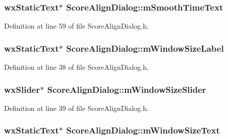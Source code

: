 \subsubsection[{\texorpdfstring{m\+Smooth\+Time\+Text}{mSmoothTimeText}}]{\setlength{\rightskip}{0pt plus 5cm}wx\+Static\+Text$\ast$ Score\+Align\+Dialog\+::m\+Smooth\+Time\+Text}\hypertarget{class_score_align_dialog_aaeda99722508558d8883d6251e5f048b}{}\label{class_score_align_dialog_aaeda99722508558d8883d6251e5f048b}


Definition at line 59 of file Score\+Align\+Dialog.\+h.

\subsubsection[{\texorpdfstring{m\+Window\+Size\+Label}{mWindowSizeLabel}}]{\setlength{\rightskip}{0pt plus 5cm}wx\+Static\+Text$\ast$ Score\+Align\+Dialog\+::m\+Window\+Size\+Label}\hypertarget{class_score_align_dialog_acac42fd64ebc2ad8581b84ef7eb4d703}{}\label{class_score_align_dialog_acac42fd64ebc2ad8581b84ef7eb4d703}


Definition at line 38 of file Score\+Align\+Dialog.\+h.

\subsubsection[{\texorpdfstring{m\+Window\+Size\+Slider}{mWindowSizeSlider}}]{\setlength{\rightskip}{0pt plus 5cm}wx\+Slider$\ast$ Score\+Align\+Dialog\+::m\+Window\+Size\+Slider}\hypertarget{class_score_align_dialog_a804aadde6fe8a04675fb55e99d274d8a}{}\label{class_score_align_dialog_a804aadde6fe8a04675fb55e99d274d8a}


Definition at line 39 of file Score\+Align\+Dialog.\+h.

\subsubsection[{\texorpdfstring{m\+Window\+Size\+Text}{mWindowSizeText}}]{\setlength{\rightskip}{0pt plus 5cm}wx\+Static\+Text$\ast$ Score\+Align\+Dialog\+::m\+Window\+Size\+Text}\hypertarget{class_score_align_dialog_a379cb8b01070bdc4f8191464918f1cc0}{}\label{class_score_align_dialog_a379cb8b01070bdc4f8191464918f1cc0}


